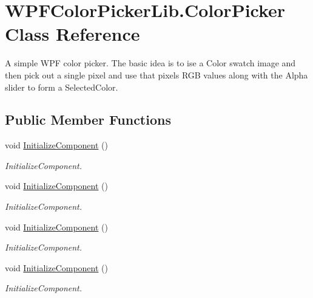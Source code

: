\hypertarget{class_w_p_f_color_picker_lib_1_1_color_picker}{
\section{WPFColorPickerLib.ColorPicker Class Reference}
\label{class_w_p_f_color_picker_lib_1_1_color_picker}
}


A simple WPF color picker. The basic idea is to ise a Color swatch image and then pick out a single pixel and use that pixels RGB values along with the Alpha slider to form a SelectedColor.  


\subsection*{Public Member Functions}
\begin{DoxyCompactItemize}
\item 
void \hyperlink{class_w_p_f_color_picker_lib_1_1_color_picker_ac44fc3f59508712d79e443108c4c3003}{InitializeComponent} ()
\begin{DoxyCompactList}\small\item\em InitializeComponent. \item\end{DoxyCompactList}\item 
void \hyperlink{class_w_p_f_color_picker_lib_1_1_color_picker_ac44fc3f59508712d79e443108c4c3003}{InitializeComponent} ()
\begin{DoxyCompactList}\small\item\em InitializeComponent. \item\end{DoxyCompactList}\item 
void \hyperlink{class_w_p_f_color_picker_lib_1_1_color_picker_ac44fc3f59508712d79e443108c4c3003}{InitializeComponent} ()
\begin{DoxyCompactList}\small\item\em InitializeComponent. \item\end{DoxyCompactList}\item 
void \hyperlink{class_w_p_f_color_picker_lib_1_1_color_picker_ac44fc3f59508712d79e443108c4c3003}{InitializeComponent} ()
\begin{DoxyCompactList}\small\item\em InitializeComponent. \item\end{DoxyCompactList}\end{DoxyCompactItemize}
